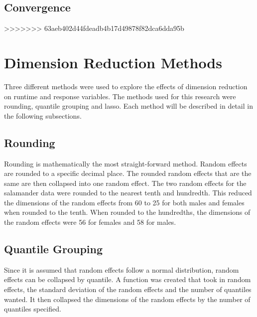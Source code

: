 \documentclass{article}
\begin{document}
\subsection{Convergence}

>>>>>>> 63aeb402d44fdeadb4b17d49878f82dca6dda95b

\section{Dimension Reduction Methods}
Three different methods were used to explore the effects of dimension reduction on runtime and response variables.  The methods used for this research were rounding, quantile grouping and lasso.  Each method will be described in detail in the following subsections.

\subsection{Rounding}
	Rounding is mathematically the most straight-forward method.  Random effects are rounded to a specific decimal place.  The rounded random effects that are the same are then collapsed into one random effect.  The two random effects for the salamander data were rounded to the nearest tenth and hundredth.  This reduced the dimensions of the random effects from 60 to 25 for both males and females when rounded to the tenth.  When rounded to the hundredths, the dimensions of the random effects were 56 for females and 58 for males.  

\subsection{Quantile Grouping}
	Since it is assumed that random effects follow a normal distribution, random effects can be collapsed by quantile.  A function was created that took in random effects, the standard deviation of the random effects and the number of quantiles wanted.  It then collapsed the dimensions of the random effects by the number of quantiles specified. 



\end{document}
